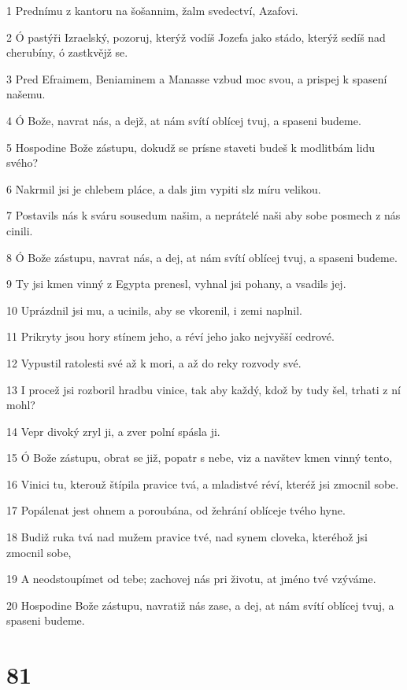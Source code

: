 \par 1 Prednímu z kantoru na šošannim, žalm svedectví, Azafovi.
\par 2 Ó pastýři Izraelský, pozoruj, kterýž vodíš Jozefa jako stádo, kterýž sedíš nad cherubíny, ó zastkvějž se.
\par 3 Pred Efraimem, Beniaminem a Manasse vzbud moc svou, a prispej k spasení našemu.
\par 4 Ó Bože, navrat nás, a dejž, at nám svítí oblícej tvuj, a spaseni budeme.
\par 5 Hospodine Bože zástupu, dokudž se prísne staveti budeš k modlitbám lidu svého?
\par 6 Nakrmil jsi je chlebem pláce, a dals jim vypiti slz míru velikou.
\par 7 Postavils nás k sváru sousedum našim, a neprátelé naši aby sobe posmech z nás cinili.
\par 8 Ó Bože zástupu, navrat nás, a dej, at nám svítí oblícej tvuj, a spaseni budeme.
\par 9 Ty jsi kmen vinný z Egypta prenesl, vyhnal jsi pohany, a vsadils jej.
\par 10 Uprázdnil jsi mu, a ucinils, aby se vkorenil, i zemi naplnil.
\par 11 Prikryty jsou hory stínem jeho, a réví jeho jako nejvyšší cedrové.
\par 12 Vypustil ratolesti své až k mori, a až do reky rozvody své.
\par 13 I procež jsi rozboril hradbu vinice, tak aby každý, kdož by tudy šel, trhati z ní mohl?
\par 14 Vepr divoký zryl ji, a zver polní spásla ji.
\par 15 Ó Bože zástupu, obrat se již, popatr s nebe, viz a navštev kmen vinný tento,
\par 16 Vinici tu, kterouž štípila pravice tvá, a mladistvé réví, kteréž jsi zmocnil sobe.
\par 17 Popálenat jest ohnem a poroubána, od žehrání oblíceje tvého hyne.
\par 18 Budiž ruka tvá nad mužem pravice tvé, nad synem cloveka, kteréhož jsi zmocnil sobe,
\par 19 A neodstoupímet od tebe; zachovej nás pri životu, at jméno tvé vzýváme.
\par 20 Hospodine Bože zástupu, navratiž nás zase, a dej, at nám svítí oblícej tvuj, a spaseni budeme.

\chapter{81}


